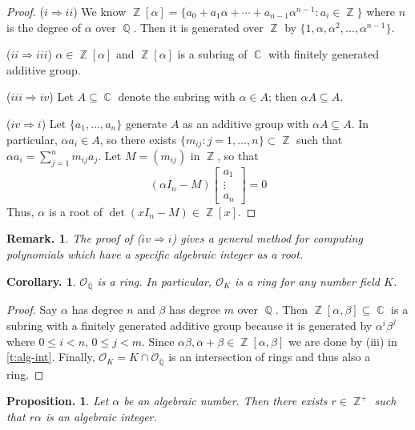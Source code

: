 \documentclass[11pt, a4paper]{memoir}
\DeclareMathOperator{\Q}{{\mathbb{Q}}}
\DeclareMathOperator{\Z}{{\mathbb{Z}}}
\DeclareMathOperator{\C}{{\mathbb{C}}}
\newcommand{\impendc}{\hspace{0.3cm}}
\newcommand{\iimp}[2]{($#1\Rightarrow#2$)}
\newcommand{\imp}[2]{\iimp{#1}{#2}\impendc}
\newcommand{\ol}[1]{\ensuremath{\overline{#1}}}
\theoremstyle{change}
\newtheorem{corollary}[theorem]{Corollary.}
\newtheorem{proposition}[theorem]{Proposition.}
\theoremstyle{plain}
\theoremstyle{nonumberplain}
\newtheorem{remark}{Remark.}
\newtheorem{proof}{Proof}
\numberwithin{equation}{section}
\begin{document}
\begin{proof}
    \imp{i}{ii}
    We know $\Z[\alpha]=\{a_0+a_1\alpha+\cdots+a_{n-1}\alpha^{n-1}:a_i\in\Z\}$ where $n$ is the degree of $\alpha$ over $\Q$.
    Then it is generated over $\Z$ by $\{1,\alpha,\alpha^2,\ldots,\alpha^{n-1}\}$.

    \imp{ii}{iii}
    $\alpha\in\Z[\alpha]$ and $\Z[\alpha]$ is a subring of $\C$ with finitely generated additive group.

    \imp{iii}{iv}
    Let $A\subseteq\C$ denote the subring with $\alpha\in A$; then $\alpha A\subseteq A$.

    \imp{iv}{i}
    Let $\{a_1,\ldots,a_n\}$ generate $A$ as an additive group with $\alpha A\subseteq A$.
    In particular, $\alpha a_i\in A$, so there exists $\{m_{ij}:j=1,\ldots,n\}\subset\Z$ such that $\alpha a_i=\sum_{j=1}^n m_{ij}a_j$.
    Let $M=(m_{ij})$ in $\Z$, so that
    \begin{equation*}
        (\alpha I_n-M)\begin{bmatrix}a_1\\\vdots\\a_n\end{bmatrix}=0
    \end{equation*}
    Thus, $\alpha$ is a root of $\det(xI_n-M)\in\Z[x]$.
\end{proof}
\begin{remark}
    The proof of \iimp{iv}{i} gives a general method for computing polynomials which have a specific algebraic integer as a root.
\end{remark}
\begin{corollary}
    $\mathcal{O}_{\ol{\Q}}$ is a ring.
    In particular, $\mathcal{O}_K$ is a ring for any number field $K$.
\end{corollary}
\begin{proof}
    Say $\alpha$ has degree $n$ and $\beta$ has degree $m$ over $\Q$.
    Then $\Z[\alpha,\beta]\subseteq\C$ is a subring with a finitely generated additive group because it is generated by $\alpha^i\beta^j$ where $0\leq i<n$, $0\leq j<m$.
    Since $\alpha\beta,\alpha+\beta\in\Z[\alpha,\beta]$ we are done by (iii) in \cref{t:alg-int}.
    Finally, $\mathcal{O}_K=K\cap\mathcal{O}_{\ol{\Q}}$ is an intersection of rings and thus also a ring.
\end{proof}
\begin{proposition}
    Let $\alpha$ be an algebraic number.
    Then there exists $r\in\Z^+$ such that $r\alpha$ is an algebraic integer.
\end{proposition}
\end{document}
